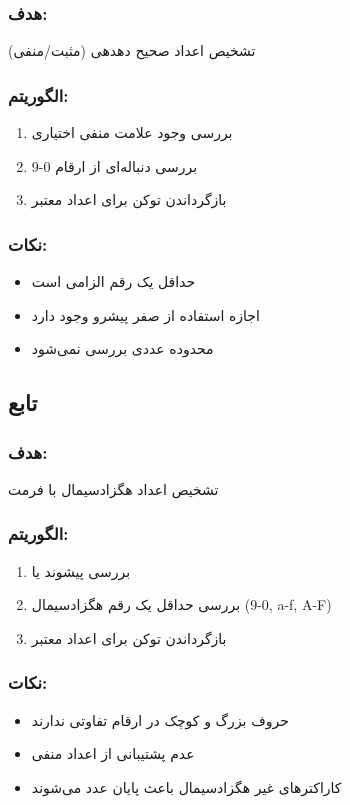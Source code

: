 \documentclass[12pt, a4paper]{report}
\begin{document}
\subsubsection*{هدف:}
تشخیص اعداد صحیح دهدهی (مثبت/منفی)

\subsubsection*{الگوریتم:}
\begin{enumerate}
\item بررسی وجود علامت منفی اختیاری
\item بررسی دنباله‌ای از ارقام 0-9
\item بازگرداندن توکن  برای اعداد معتبر
\end{enumerate}

\subsubsection*{نکات:}
\begin{itemize}
\item حداقل یک رقم الزامی است
\item اجازه استفاده از صفر پیشرو وجود دارد
\item محدوده عددی بررسی نمی‌شود
\end{itemize}

\subsection{تابع }
\label{subsec:is_hexadecimal}

\subsubsection*{هدف:}
تشخیص اعداد هگزادسیمال با فرمت 

\subsubsection*{الگوریتم:}
\begin{enumerate}
\item بررسی پیشوند  یا 
\item بررسی حداقل یک رقم هگزادسیمال (0-9, a-f, A-F)
\item بازگرداندن توکن  برای اعداد معتبر
\end{enumerate}

\subsubsection*{نکات:}
\begin{itemize}
\item حروف بزرگ و کوچک در ارقام تفاوتی ندارند
\item عدم پشتیبانی از اعداد منفی
\item کاراکترهای غیر هگزادسیمال باعث پایان عدد می‌شوند
\end{itemize}
\end{document}
